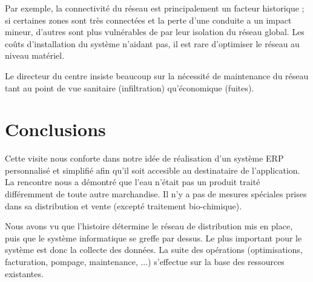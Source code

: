 \documentclass[a4paper, 11pt]{article}
\begin{document}
Par exemple, la connectivité du réseau est principalement un facteur historique ; si certaines zones sont très connectées et la perte d'une conduite a un impact mineur, d'autres sont plus vulnérables de par leur isolation du réseau global. Les coûts d'installation du système n'aidant pas, il est rare d'optimiser le réseau au niveau matériel.

Le directeur du centre insiste beaucoup sur la nécessité de maintenance du réseau tant au point de vue sanitaire (infiltration) qu'économique (fuites).

\section*{Conclusions}

Cette visite nous conforte dans notre idée de réalisation d'un système ERP personnalisé et simplifié afin qu'il soit accesible au destinataire de l'application. La rencontre nous a démontré que l'eau n'était pas un produit traité différemment de toute autre marchandise. Il n'y a pas de mesures spéciales prises dans sa distribution et vente (excepté traitement bio-chimique).

Nous avons vu que l'histoire détermine le réseau de distribution mis en place, puis que le système informatique se greffe par dessus. Le plus important pour le système est donc la collecte des données. La suite des opérations (optimisations, facturation, pompage, maintenance, ...) s'effectue sur la base des ressources existantes.
\end{document}
